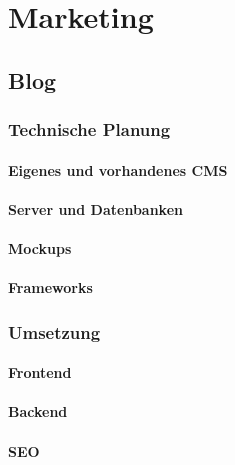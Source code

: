 \chapter{Marketing}
\renewcommand{\kapitelautor}{Autor: Markus Kaiser}

\section{Blog}

  \subsection{Technische Planung}

    \subsubsection{Eigenes und vorhandenes CMS}

    \subsubsection{Server und Datenbanken}

    \subsubsection{Mockups}

    \subsubsection{Frameworks}

  \subsection{Umsetzung}

    \subsubsection{Frontend}

    \subsubsection{Backend}

    \subsubsection{SEO}

